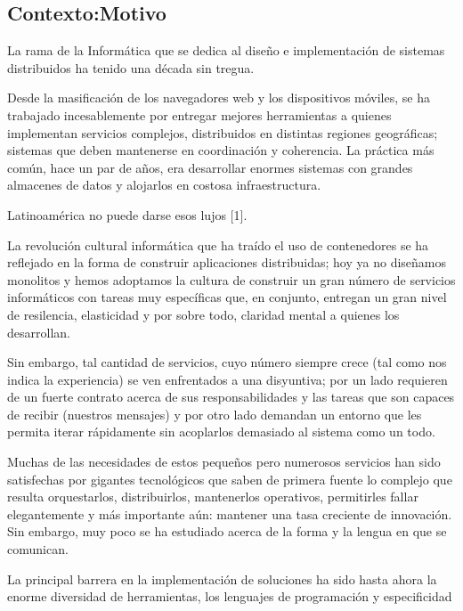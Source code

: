 
\subsection{Contexto:Motivo}
La rama de la Informática que se dedica al diseño e implementación de sistemas distribuidos ha tenido una década sin tregua.

Desde la masificación de los navegadores web y los dispositivos móviles, se ha trabajado incesablemente por entregar mejores herramientas a quienes implementan servicios complejos, distribuidos en distintas regiones geográficas; sistemas que deben mantenerse en coordinación y coherencia. La práctica más común, hace un par de años, era desarrollar enormes sistemas con grandes almacenes de datos y alojarlos en costosa infraestructura.

Latinoamérica no puede darse esos lujos [1].

La revolución cultural informática que ha traído el uso de contenedores se ha reflejado en la forma de construir aplicaciones distribuidas; hoy ya no diseñamos monolitos y hemos adoptamos la cultura de construir un gran número de servicios informáticos con tareas muy específicas que, en conjunto, entregan un gran nivel de resilencia, elasticidad y por sobre todo, claridad mental a quienes los desarrollan.

Sin embargo, tal cantidad de servicios, cuyo número siempre crece (tal como nos indica la experiencia) se ven enfrentados a una disyuntiva; por un lado requieren de un fuerte contrato acerca de sus responsabilidades y las tareas que son capaces de recibir (nuestros mensajes) y por otro lado demandan un entorno que les permita iterar rápidamente sin acoplarlos demasiado al sistema como un todo.

Muchas de las necesidades de estos pequeños pero numerosos servicios han sido satisfechas por gigantes tecnológicos que saben de primera fuente lo complejo que resulta orquestarlos, distribuirlos, mantenerlos operativos, permitirles fallar elegantemente y más importante aún: mantener una tasa creciente de innovación. Sin embargo, muy poco se ha estudiado acerca de la forma y la lengua en que se comunican.

La principal barrera en la implementación de soluciones ha sido hasta ahora la enorme diversidad de herramientas, los lenguajes de programación y especificidad en cada solución. Este trabajo busca transformar esta debilidad en una oportunidad para los arquitectos de software [2].

